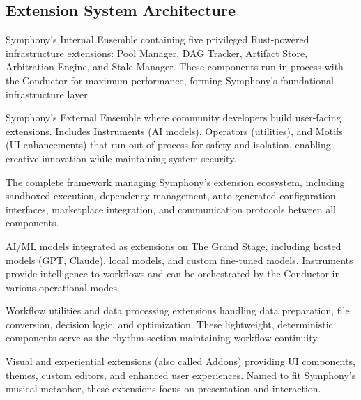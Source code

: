 \subsection*{Extension System Architecture}

\begin{description}[leftmargin=4cm,labelwidth=3.5cm]

\item[\textbf{The Pit}] Symphony's Internal Ensemble containing five privileged Rust-powered infrastructure extensions: Pool Manager, DAG Tracker, Artifact Store, Arbitration Engine, and Stale Manager. These components run in-process with the Conductor for maximum performance, forming Symphony's foundational infrastructure layer.

\item[\textbf{The Grand Stage}] Symphony's External Ensemble where community developers build user-facing extensions. Includes Instruments (AI models), Operators (utilities), and Motifs (UI enhancements) that run out-of-process for safety and isolation, enabling creative innovation while maintaining system security.

\item[\textbf{Orchestra Kit}] The complete framework managing Symphony's extension ecosystem, including sandboxed execution, dependency management, auto-generated configuration interfaces, marketplace integration, and communication protocols between all components.

\item[\textbf{Instrument}] AI/ML models integrated as extensions on The Grand Stage, including hosted models (GPT, Claude), local models, and custom fine-tuned models. Instruments provide intelligence to workflows and can be orchestrated by the Conductor in various operational modes.

\item[\textbf{Operator}] Workflow utilities and data processing extensions handling data preparation, file conversion, decision logic, and optimization. These lightweight, deterministic components serve as the rhythm section maintaining workflow continuity.

\item[\textbf{Motif}] Visual and experiential extensions (also called Addons) providing UI components, themes, custom editors, and enhanced user experiences. Named to fit Symphony's musical metaphor, these extensions focus on presentation and interaction.

\end{description}

